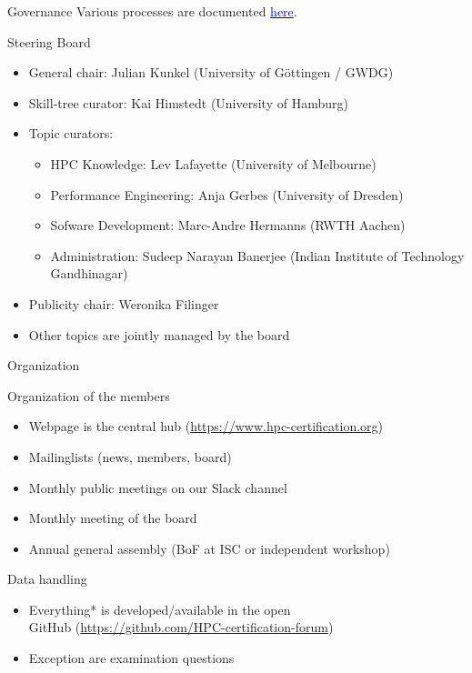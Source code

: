 \documentclass[compress,aspectratio=169]{beamer}
\newcommand{\hrefb}[2]{\href{#1}{\textcolor{blue}{#2}}}
\begin{document}
\begin{frame}{Governance}
	\smallskip
  Various processes are documented \hrefb{https://www.hpc-certification.org/processes/}{here}.
  \begin{block}{Steering Board}
  \vspace*{-0.5em}
  \begin{itemize}
    \item General chair: Julian Kunkel (University of Göttingen / GWDG)
    \item Skill-tree curator: Kai Himstedt (University of Hamburg)
    \item Topic curators:
    \begin{itemize}
      \item HPC Knowledge: Lev Lafayette (University of Melbourne)
      \item Performance Engineering: Anja Gerbes (University of Dresden)
      \item Sofware Development: Marc-Andre Hermanns (RWTH Aachen)
      \item Administration: Sudeep Narayan Banerjee (Indian Institute of Technology Gandhinagar)
    \end{itemize}    
    \item Publicity chair: Weronika Filinger
    \item Other topics are jointly managed by the board
  \end{itemize}
  \end{block}
\end{frame}



\begin{frame}{Organization}
  \begin{block}{Organization of the members}
	\begin{itemize}
  \item Webpage is the central hub (\url{https://www.hpc-certification.org})
  \item Mailinglists (news, members, board)
	\item Monthly public meetings on our Slack channel
  \item Monthly meeting of the board
  \item Annual general assembly (BoF at ISC or independent workshop)
  \end{itemize}
  \end{block}

  \begin{block}{Data handling}
    \begin{itemize}
      \item Everything* is developed/available in the open \\
        GitHub (\url{https://github.com/HPC-certification-forum})
      \item Exception are examination questions
    \end{itemize}
  \end{block}
\end{frame}
\end{document}

